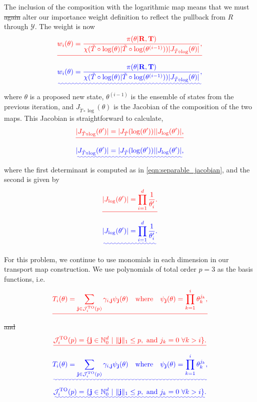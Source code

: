 \documentclass[final]{siamltex}
\newcommand{\edit}[1]{{\color{red} #1}}  %
\providecommand{\DIFadd}[1]{{\protect\color{blue}\uwave{#1}}} %
\providecommand{\DIFdel}[1]{{\protect\color{red}\sout{#1}}}                      %
\providecommand{\DIFaddbegin}{} %
\providecommand{\DIFaddend}{} %
\providecommand{\DIFdelbegin}{} %
\providecommand{\DIFdelend}{} %
\newcommand{\DIFscaledelfig}{0.5}
\newlength{\DIFdelgraphicswidth} %
\newlength{\DIFdelgraphicsheight} %
\newcommand{\DIFaddincludegraphics}[2][]{{\color{blue}\fbox{\DIFOincludegraphics[#1]{#2}}}} %
\newcommand{\DIFdelincludegraphics}[2][]{%
\sbox{\DIFdelgraphicsbox}{\DIFOincludegraphics[#1]{#2}}%
\settoboxwidth{\DIFdelgraphicswidth}{\DIFdelgraphicsbox} %
\settoboxtotalheight{\DIFdelgraphicsheight}{\DIFdelgraphicsbox} %
\scalebox{\DIFscaledelfig}{%
\parbox[b]{\DIFdelgraphicswidth}{\usebox{\DIFdelgraphicsbox}\\[-\baselineskip] \rule{\DIFdelgraphicswidth}{0em}}\llap{\resizebox{\DIFdelgraphicswidth}{\DIFdelgraphicsheight}{%
\setlength{\unitlength}{\DIFdelgraphicswidth}%
\begin{picture}(1,1)%
\thicklines\linethickness{2pt} %
{\color[rgb]{1,0,0}\put(0,0){\framebox(1,1){}}}%
{\color[rgb]{1,0,0}\put(0,0){\line( 1,1){1}}}%
{\color[rgb]{1,0,0}\put(0,1){\line(1,-1){1}}}%
\end{picture}%
}\hspace*{3pt}}} %
} %
\DeclareRobustCommand{\DIFaddbegin}{\DIFOaddbegin \let\includegraphics\DIFaddincludegraphics} %
\DeclareRobustCommand{\DIFaddend}{\DIFOaddend \let\includegraphics\DIFOincludegraphics} %
\DeclareRobustCommand{\DIFdelbegin}{\DIFOdelbegin \let\includegraphics\DIFdelincludegraphics} %
\DeclareRobustCommand{\DIFdelend}{\DIFOaddend \let\includegraphics\DIFOincludegraphics} %
\begin{document}
\edit{ The inclusion of the composition with the logarithmic map} \DIFaddend means that we must \DIFdelbegin \DIFdel{again }\DIFdelend alter our importance weight definition to reflect the pullback from $R$ through $\mathcal{Y}$. The weight is now
\DIFdelbegin \[
	\DIFdel{w_i(\theta) = \frac{\pi(\theta|\mathbf{R},\mathbf{T})}{\chi(\tilde{T}\circ\log(\theta)|\tilde{T}\circ\log(\theta^{(i-1)}))|J_{\tilde{T}\circ\log}(\theta)|},
}\]
\DIFdelend \DIFaddbegin \begin{equation}
	\DIFadd{w_i(\theta) = \frac{\pi(\theta|\mathbf{R},\mathbf{T})}{\chi(\tilde{T}\circ\log(\theta)|\tilde{T}\circ\log(\theta^{(i-1)}))|J_{\tilde{T}\circ\log}(\theta)|},
}\end{equation}
\DIFaddend where $\theta$ is a proposed new state, $\theta^{(i-1)}$ is the ensemble of states from the previous iteration, and $J_{\tilde{T}\circ\log}(\theta)$ is the Jacobian of the composition of the two maps. This Jacobian is straightforward to calculate,
\DIFdelbegin \[
	\DIFdel{|J_{\tilde{T}\circ\log}(\theta')| = |J_{\tilde{T}}(\log(\theta'))||J_{\log}(\theta')|,
}\]
\DIFdelend \DIFaddbegin \begin{equation}
	\DIFadd{|J_{\tilde{T}\circ\log}(\theta')| = |J_{\tilde{T}}(\log(\theta'))||J_{\log}(\theta')|,
}\end{equation}
\DIFaddend where the first determinant is computed as in
\eqref{eqn:separable_jacobian}, and the second is given by
\DIFdelbegin \[
	\DIFdel{|J_{\log}(\theta')| = \prod\limits_{i=1}^d \frac{1}{\theta'_i}.
}\]
\DIFdelend \DIFaddbegin \begin{equation}
	\DIFadd{|J_{\log}(\theta')| = \prod\limits_{i=1}^d \frac{1}{\theta'_i}.
}\end{equation}
\DIFaddend 

For this problem, we continue to use monomials in each dimension in our transport map construction. We use polynomials of total order $p=3$ as the basis functions, i.e.
\DIFdelbegin \[
	\DIFdel{T_i(\theta) = \sum_{\mathbf{j}\in\mathcal{J}^{\text{TO}}_i(p)} \gamma_{i,\mathbf{j}}\psi_{\mathbf{j}}(\theta) \quad \text{where} \quad \psi_\mathbf{j}(\theta) = \prod\limits_{k=1}^i \theta_k^{j_k},
}\]
\DIFdel{and
}\[
	\DIFdel{\mathcal{J}^{\text{TO}}_i(p) = \{\mathbf{j} \in \mathbb{N}^d_0\ |\ \|\mathbf{j}\|_1 \leq p, \ \text{and}\ j_k = 0\ \forall k > i\}.
}\]
\DIFdelend \DIFaddbegin \begin{equation}
	\DIFadd{T_i(\theta) = \sum_{\mathbf{j}\in\mathcal{J}^{\text{TO}}_i(p)} \gamma_{i,\mathbf{j}}\psi_{\mathbf{j}}(\theta) \quad \text{where} \quad \psi_\mathbf{j}(\theta) = \prod\limits_{k=1}^i \theta_k^{j_k},
}\end{equation}
\DIFadd{and
}\begin{equation}
	\DIFadd{\mathcal{J}^{\text{TO}}_i(p) = \{\mathbf{j} \in \mathbb{N}^d_0\ |\ \|\mathbf{j}\|_1 \leq p, \ \text{and}\ j_k = 0\ \forall k > i\}.
}\end{equation}
\DIFaddend 
\end{document}
